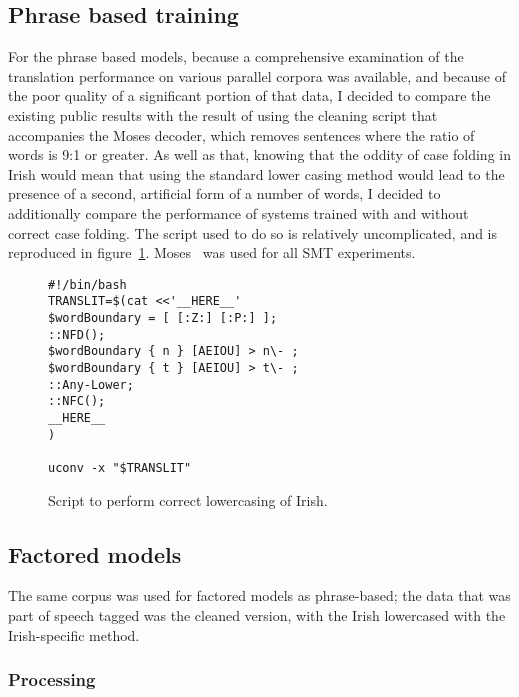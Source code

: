 

%

\subsection{Phrase based training}

For the phrase based models, because a comprehensive examination of the translation performance on various
parallel corpora was available, and because of the poor quality of a significant portion of that data,
I decided to compare the existing public results with the result of using the cleaning script that
accompanies the Moses decoder, which removes sentences where the ratio of words is 9:1 or greater. 
As well as that, knowing that the oddity of case folding in Irish would
mean that using the standard lower casing method would lead to the presence of a second, artificial form
of a number of words, I decided to additionally compare the performance of systems trained with and
without correct case folding. The script used to do so is relatively uncomplicated, and is reproduced in 
figure~\ref{fig:tolowersh}. Moses~\citep{Koehn:2007:MOS:1557769.1557821} was used for all SMT experiments.

\begin{figure}
\begin{verbatim}
#!/bin/bash
TRANSLIT=$(cat <<'__HERE__'
$wordBoundary = [ [:Z:] [:P:] ];
::NFD();
$wordBoundary { n } [AEIOU] > n\- ;
$wordBoundary { t } [AEIOU] > t\- ;
::Any-Lower;
::NFC();
__HERE__
)

uconv -x "$TRANSLIT"
\end{verbatim}
\label{fig:tolowersh}
\caption{Script to perform correct lowercasing of Irish.}
\end{figure}

\subsection{Factored models}

The same corpus was used for factored models as phrase-based; the data that was part of speech tagged was the cleaned version,
with the Irish lowercased with the Irish-specific method.

\subsubsection{Processing}

